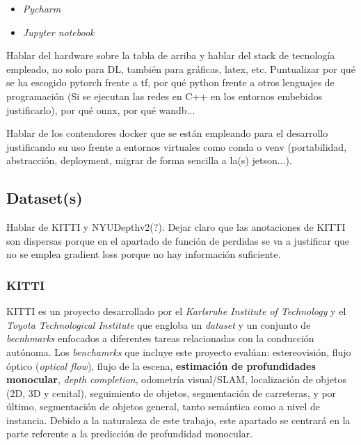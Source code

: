\documentclass[a4paper, 11pt]{article}
\begin{document}
\begin{itemize}
\begin{itemize}
		\item \textit{Pycharm}
		\item \textit{Jupyter notebook}
	\end{itemize}
\end{itemize}





Hablar del hardware sobre la tabla de arriba y hablar del stack de tecnología empleado, no solo para DL, también para gráficas, latex, etc. Puntualizar por qué se ha escogido pytorch frente a tf, por qué python frente a otros lenguajes de programación (Si se ejecutan las redes en C++ en los entornos embebidos justificarlo), por qué onnx, por qué wandb... 

Hablar de los contendores docker que se están empleando para el desarrollo justificando su uso frente a entornos virtuales como conda o venv (portabilidad, abstracción, deployment, migrar de forma sencilla a la(s) jetson...).






\subsection{Dataset(s)}
Hablar de KITTI y NYUDepthv2(?). Dejar claro que las anotaciones de KITTI son dispersas porque en el apartado de función de perdidas se va a justificar que no se emplea gradient loss porque no hay información suficiente.

\subsubsection{KITTI}
KITTI \cite{KITTI-dataset, KITTI-benchmarks, KITTI-road-benchmark, KITTI-sceneflow-benchmark} es un proyecto desarrollado por el \textit{Karlsruhe Institute of Technology} y el \textit{Toyota Technological Institute} que engloba un \textit{dataset} y un conjunto de \textit{becnhmarks} enfocados a diferentes tareas relacionadas con la conducción autónoma. Los \textit{benchamrks} que incluye este proyecto evalúan: estereovisión, flujo óptico (\textit{optical flow}), flujo de la escena, \textbf{estimación de profundidades monocular}, \textit{depth completion}, odometría visual/SLAM, localización de objetos (2D, 3D y cenital), seguimiento de objetos, segmentación de carreteras, y por último, segmentación de objetos general, tanto semántica como a nivel de instancia. Debido a la naturaleza de este trabajo, este apartado se centrará en la parte referente a la predicción de profundidad monocular.
\end{document}

